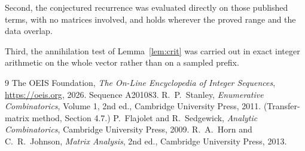 \documentclass[11pt,a4paper]{article}
\theoremstyle{plain}
\theoremstyle{definition}
\begin{document}
Second, the conjectured recurrence was evaluated directly on those published terms, with no
matrices involved, and holds wherever the proved range and the data overlap.

Third, the annihilation test of Lemma~\ref{lem:crit} was carried out in exact integer
arithmetic on the whole vector rather than on a sampled prefix.

\begin{thebibliography}{9}
 The OEIS Foundation, \emph{The On-Line Encyclopedia of Integer
Sequences}, \url{https://oeis.org}, 2026. Sequence A201083.
 R.~P.~Stanley, \emph{Enumerative Combinatorics}, Volume 1, 2nd ed.,
Cambridge University Press, 2011. (Transfer-matrix method, Section 4.7.)
 P.~Flajolet and R.~Sedgewick, \emph{Analytic Combinatorics}, Cambridge
University Press, 2009.
 R.~A.~Horn and C.~R.~Johnson, \emph{Matrix Analysis}, 2nd ed., Cambridge
University Press, 2013.
\end{thebibliography}
\end{document}
